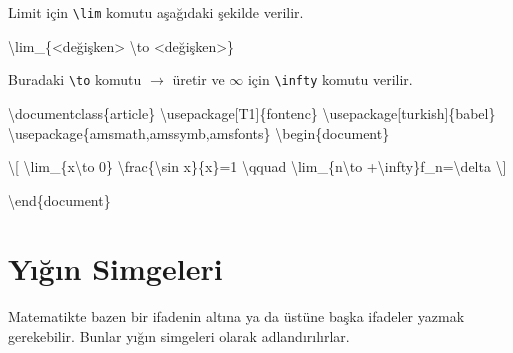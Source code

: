 \documentclass[
  letterpaper,
  DIV=11,
  numbers=noendperiod]{scrreprt}
\newenvironment{Shaded}{\begin{snugshade}}{\end{snugshade}}
\newcommand{\BuiltInTok}[1]{\textcolor[rgb]{0.00,0.23,0.31}{#1}}
\newcommand{\ExtensionTok}[1]{\textcolor[rgb]{0.00,0.23,0.31}{#1}}
\newcommand{\FunctionTok}[1]{\textcolor[rgb]{0.28,0.35,0.67}{#1}}
\newcommand{\KeywordTok}[1]{\textcolor[rgb]{0.00,0.23,0.31}{#1}}
\newcommand{\NormalTok}[1]{\textcolor[rgb]{0.00,0.23,0.31}{#1}}
\newcommand{\SpecialCharTok}[1]{\textcolor[rgb]{0.37,0.37,0.37}{#1}}
\newcommand{\SpecialStringTok}[1]{\textcolor[rgb]{0.13,0.47,0.30}{#1}}
\begin{document}
Limit için \texttt{\textbackslash{}lim} komutu aşağıdaki şekilde
verilir.

\begin{Shaded}
\begin{Highlighting}[]
\FunctionTok{\textbackslash{}lim}\NormalTok{\_\{\textless{}değişken\textgreater{} }\FunctionTok{\textbackslash{}to}\NormalTok{ \textless{}değişken\textgreater{}\}}
\end{Highlighting}
\end{Shaded}

Buradaki \texttt{\textbackslash{}to} komutu \(\to\) üretir ve \(\infty\)
için \texttt{\textbackslash{}infty} komutu verilir.

\begin{Shaded}
\begin{Highlighting}[]
\BuiltInTok{\textbackslash{}documentclass}\NormalTok{\{}\ExtensionTok{article}\NormalTok{\}}
\BuiltInTok{\textbackslash{}usepackage}\NormalTok{[T1]\{}\ExtensionTok{fontenc}\NormalTok{\}}
\BuiltInTok{\textbackslash{}usepackage}\NormalTok{[turkish]\{}\ExtensionTok{babel}\NormalTok{\}}
\BuiltInTok{\textbackslash{}usepackage}\NormalTok{\{}\ExtensionTok{amsmath,amssymb,amsfonts}\NormalTok{\}}
\KeywordTok{\textbackslash{}begin}\NormalTok{\{}\ExtensionTok{document}\NormalTok{\}}

\SpecialStringTok{\textbackslash{}[}
\SpecialCharTok{\textbackslash{}lim}\SpecialStringTok{\_\{x}\SpecialCharTok{\textbackslash{}to}\SpecialStringTok{ 0\}}
\SpecialCharTok{\textbackslash{}frac}\SpecialStringTok{\{}\SpecialCharTok{\textbackslash{}sin}\SpecialStringTok{ x\}\{x\}=1 }\SpecialCharTok{\textbackslash{}qquad}
\SpecialCharTok{\textbackslash{}lim}\SpecialStringTok{\_\{n}\SpecialCharTok{\textbackslash{}to}\SpecialStringTok{ +}\SpecialCharTok{\textbackslash{}infty}\SpecialStringTok{\}f\_n=}\SpecialCharTok{\textbackslash{}delta}
\SpecialStringTok{\textbackslash{}]}

\KeywordTok{\textbackslash{}end}\NormalTok{\{}\ExtensionTok{document}\NormalTok{\}}
\end{Highlighting}
\end{Shaded}

\hypertarget{yux131ux11fux131n-simgeleri}{%
\section{Yığın Simgeleri}\label{yux131ux11fux131n-simgeleri}}

Matematikte bazen bir ifadenin altına ya da üstüne başka ifadeler yazmak
gerekebilir. Bunlar yığın simgeleri olarak adlandırılırlar.
\end{document}
